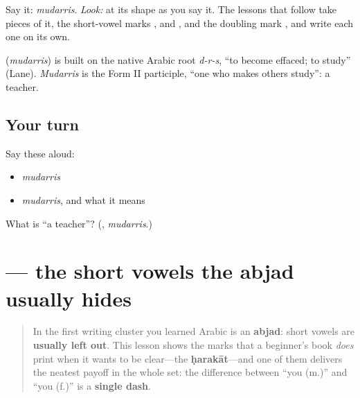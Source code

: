 Say it: \emph{mudarris}. \emph{Look:} at its shape as you say it. The lessons that follow take pieces of it, the short-vowel marks \textbf{}, \textbf{} and \textbf{}, and the doubling mark \textbf{}, and write each one on its own.

\begin{cousinweb}
\textbf{} (\emph{mudarris}) is built on the native Arabic root \emph{d-r-s}, \textquotedblleft{}to become effaced; to study\textquotedblright{} (Lane). \emph{Mudarris} is the Form II participle, \textquotedblleft{}one who makes others study\textquotedblright{}: a teacher.
\end{cousinweb}

\subsection*{Your turn}
Say these aloud:

\begin{itemize}
\raggedright
  \item \emph{mudarris}
  \item \emph{mudarris}, and what it means
\end{itemize}

\begin{tcolorbox}[breakable,colback=teal!4,colframe=teal!35!black,title={Before you move on}]
What is \textquotedblleft{}a teacher\textquotedblright{}? (\textbf{}, \emph{mudarris}.)
\end{tcolorbox}
\section[\texorpdfstring{\ar{َ} \ar{ِ} \ar{ُ} (fatḥa, kasra, ḍamma; hamza)}{َ ِ ُ (fatḥa, kasra, ḍamma; hamza)}]{   — the short vowels the abjad usually hides}

\label{lesson:AR-W06-harakat-and-hamza}



\begin{quote}
In the first writing cluster you learned Arabic is an \textbf{abjad}: short vowels are \textbf{usually left out}. This lesson shows the marks that a beginner's book \emph{does} print when it wants to be clear—the \textbf{ḥarakāt}—and one of them delivers the neatest payoff in the whole set: the difference between \textquotedblleft{}you (m.)\textquotedblright{} and \textquotedblleft{}you (f.)\textquotedblright{} is a \textbf{single dash}.
\end{quote}

